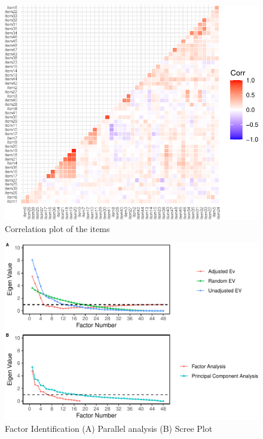 \documentclass[
  english,
  man]{apa6}
\begin{document}
\begin{appendix}
\begin{center}
\begin{ThreePartTable}
\end{ThreePartTable}
\end{center}

\begin{figure}
\includegraphics[width=1\linewidth]{manuscript_files/figure-latex/figCorAppB-1} \caption{Correlation plot of the items}\label{fig:figCorAppB}
\end{figure}

\begin{figure}
\centering
\includegraphics{manuscript_files/figure-latex/facIdFigAppB-1.pdf}
\caption{\label{fig:facIdFigAppB}Factor Identification (A) Parallel analysis
(B) Scree Plot}
\end{figure}


\end{appendix}
\end{document}
